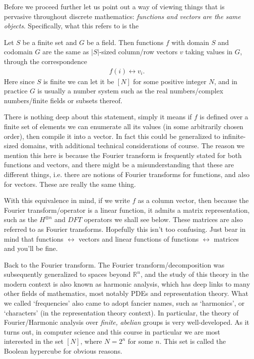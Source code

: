 Before we proceed further let us point out a way of viewing things that is pervasive throughout discrete mathematics: \textit{functions and vectors are the same objects}. Specifically, what this refers to is the
\begin{fact}\label{remark:function-vector_equivalence}
    Let $S$ be a finite set and $G$ be a field. Then functions $f$ with domain $S$ and codomain $G$ are the same as $|S|$-sized column/row vectors $v$ taking values in $G$, through the correspondence
    \begin{align*}
        f(i) \leftrightarrow v_i.
    \end{align*}
    Here since $S$ is finite we can let it be $[N]$ for some positive integer $N$, and in practice $G$ is usually a number system such as the real numbers/complex numbers/finite fields or subsets thereof.
    
    There is nothing deep about this statement, simply it means if $f$ is defined over a finite set of elements we can enumerate all its values (in some arbitrarily chosen order), then compile it into a vector. In fact this could be generalized to infinite-sized domains, with additional technical considerations of course. The reason we mention this here is because the Fourier transform is frequently stated for both functions and vectors, and there might be a misunderstanding that these are different things, i.e. there are notions of Fourier transforms for functions, and also for vectors. These are really the same thing.

    With this equivalence in mind, if we write $f$ as a column vector, then because the Fourier transform/operator is a linear function, it admits a matrix representation, such as the $H^{\otimes n}$ and $DFT$ operators we shall see below. These matrices are also referred to as Fourier transforms. Hopefully this isn't too confusing. Just bear in mind that functions $\leftrightarrow$ vectors and linear functions of functions $\leftrightarrow$ matrices and you'll be fine.
\end{fact}

Back to the Fourier transform. The Fourier transform/decomposition was subsequently generalized to spaces beyond $\mathbb{R}^n$, and the study of this theory in the modern context is also known as harmonic analysis, which has deep links to many other fields of mathematics, most notably PDEs and representation theory. What we called `frequencies' also came to adopt fancier names, such as `harmonics', or `characters' (in the representation theory context). In particular, the theory of Fourier/Harmonic analysis over \textit{finite, abelian} groups is very well-developed. As it turns out, in computer science and this course in particular we are most interested in the set $[N]$, where $N=2^n$ for some $n$. This set is called the Boolean hypercube for obvious reasons.


